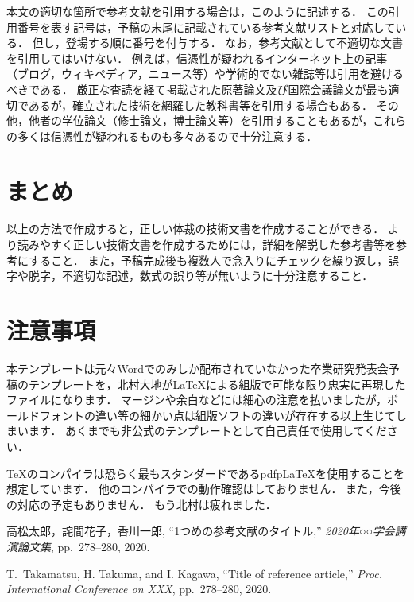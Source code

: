 \documentclass[a4j]{jsarticle}
\begin{document}
本文の適切な箇所で参考文献を引用する場合は，このように記述する\cite{sample1}．
この引用番号を表す記号は，予稿の末尾に記載されている参考文献リストと対応している\cite{sample2}．
但し，登場する順に番号を付与する．
なお，参考文献として不適切な文書を引用してはいけない．
例えば，信憑性が疑われるインターネット上の記事（ブログ，ウィキペディア，ニュース等）や学術的でない雑誌等は引用を避けるべきである．
厳正な査読を経て掲載された原著論文及び国際会議論文が最も適切であるが，確立された技術を網羅した教科書等を引用する場合もある．
その他，他者の学位論文（修士論文，博士論文等）を引用することもあるが，これらの多くは信憑性が疑われるものも多々あるので十分注意する．

\section{まとめ}

以上の方法で作成すると，正しい体裁の技術文書を作成することができる．
より読みやすく正しい技術文書を作成するためには，詳細を解説した参考書等を参考にすること．
また，予稿完成後も複数人で念入りにチェックを繰り返し，誤字や脱字，不適切な記述，数式の誤り等が無いように十分注意すること．

\section{注意事項}

本テンプレートは元々Wordでのみしか配布されていなかった卒業研究発表会予稿のテンプレートを，北村大地がLaTeXによる組版で可能な限り忠実に再現したファイルになります．
マージンや余白などには細心の注意を払いましたが，ボールドフォントの違い等の細かい点は組版ソフトの違いが存在する以上生じてしまいます．
あくまでも非公式のテンプレートとして自己責任で使用してください．

TeXのコンパイラは恐らく最もスタンダードであるpdfpLaTeXを使用することを想定しています．
他のコンパイラでの動作確認はしておりません．
また，今後の対応の予定もありません．
もう北村は疲れました．


\begin{thebibliography}{9}%

  高松太郎，詫間花子，香川一郎,
  ``1つめの参考文献のタイトル,''
  {\em 2020年○○学会講演論文集}, pp.~278--280, 2020.

  T.~Takamatsu, H. Takuma, and I. Kagawa, 
  ``Title of reference article,''
  {\em Proc. International Conference on XXX}, pp.~278--280, 2020.


\end{thebibliography}
\end{document}
